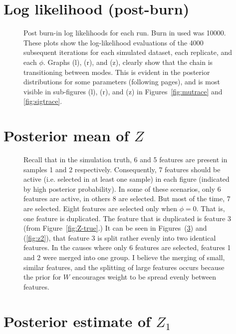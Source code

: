 \documentclass[10pt]{article} %
\begin{document}
\newpage
\section{Log likelihood (post-burn)}
\begin{figure}[H]
  \begin{center}  %
  \end{center}
  \caption{Post burn-in log likelihoods for each run. Burn in used was 10000.
    These plots show the log-likelihood evaluations of the 4000 subsequent
    iterations for each simulated dataset, each replicate, and each $\phi$.
    Graphs (l), (r), and (z), clearly show that the chain is transitioning
    between modes.  This is evident in the posterior distributions for some
    parameters (following pages), and is most visible in sub-figures (l), (r),
    and (z) in Figures~\ref{fig:mutrace} and \ref{fig:sigtrace}.}
  \label{fig:ll}
\end{figure}

\newpage
\section{Posterior mean of $Z$}
\begin{figure}[H]
  \begin{center}  %
  \end{center}
  \caption{Recall that in the simulation truth, 6 and 5 features are present in
    samples 1 and 2 respectively. Consequently, 7 features should be active
    (i.e. selected in at least one sample) in each figure (indicated by high
    posterior probability). In some of these scenarios, only 6 features are
    active, in others 8 are selected. But most of the time, 7 are selected. 
    Eight features are selected only when $\phi=0$. That is, one feature is duplicated.
    The feature that is duplicated is feature 3 (from Figure~\ref{fig:Z-true}.)
    It can be seen in Figures~(\ref{fig:z1}) and (\ref{fig:z2}), that feature 3 is
    split rather evenly into two identical features. In the causes where only 6 features
    are selected, features 1 and 2 were merged into one group. I believe the merging 
    of small, similar features, and the splitting of large features occurs because the 
    prior for $W$ encourages weight to be spread evenly between features.}
  \label{fig:zmean}
\end{figure}

\newpage
\section{Posterior estimate of $Z_1$}
\begin{figure}[H]
  \begin{center}  %
  \end{center}
  \label{fig:z1}
\end{figure}
\end{document}

